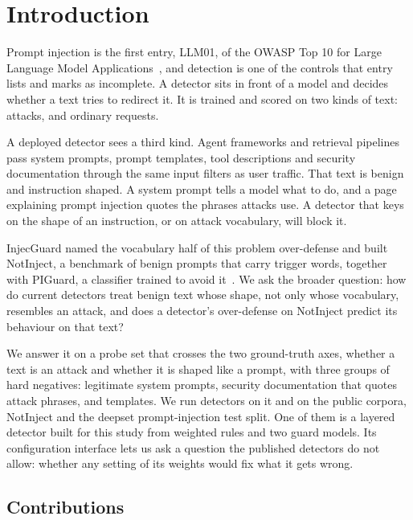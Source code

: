 \documentclass[conference]{IEEEtran}
\begin{document}
\section{Introduction}\label{sec:intro}

Prompt injection is the first entry, LLM01, of the OWASP Top 10 for Large
Language Model Applications~\cite{owasp2025, owasp2026}, and detection is one
of the controls that entry lists and marks as incomplete. A detector sits in
front of a model and decides whether a text tries to redirect it. It is
trained and scored on two kinds of text: attacks, and ordinary requests.

A deployed detector sees a third kind. Agent frameworks and retrieval
pipelines pass system prompts, prompt templates, tool descriptions and
security documentation through the same input filters as user traffic. That
text is benign and instruction shaped. A system prompt tells a model what to
do, and a page explaining prompt injection quotes the phrases attacks use. A
detector that keys on the shape of an instruction, or on attack vocabulary,
will block it.

InjecGuard named the vocabulary half of this problem over-defense and built
NotInject, a benchmark of benign prompts that carry trigger words, together
with PIGuard, a classifier trained to avoid it~\cite{li2024injecguard}. We
ask the broader question: how do current detectors treat benign text whose
shape, not only whose vocabulary, resembles an attack, and does a detector's
over-defense on NotInject predict its behaviour on that text?

We answer it on a probe set that crosses the two ground-truth axes, whether a
text is an attack and whether it is shaped like a prompt, with three groups
of hard negatives: legitimate system prompts, security documentation that
quotes attack phrases, and templates. We run \NDetectorsCompared{} detectors
on it and on the public corpora, NotInject and the deepset prompt-injection test split.
One of them is a layered detector built for this study from weighted
rules and two guard models. Its configuration interface lets us ask a
question the published detectors do not allow: whether any setting of its
weights would fix what it gets wrong.

\subsection{Contributions}
\end{document}

